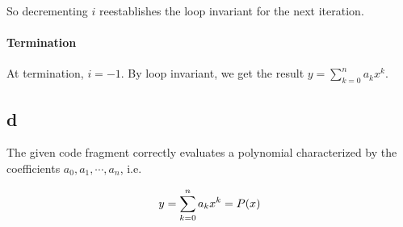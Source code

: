 So decrementing $i$ reestablishes the loop invariant for the next iteration.

\paragraph{Termination}
At termination, $i = -1$. By loop invariant, we get the result $y = \sum_{k = 0}^n a_k x^k$.


\subsection{d}

The given code fragment correctly evaluates a polynomial characterized by the coefficients $a_0, a_1, \cdots, a_n$, i.e.

\begin{equation}\notag
y = \sum_{k = 0}^n a_k x^k = P(x)
\end{equation}